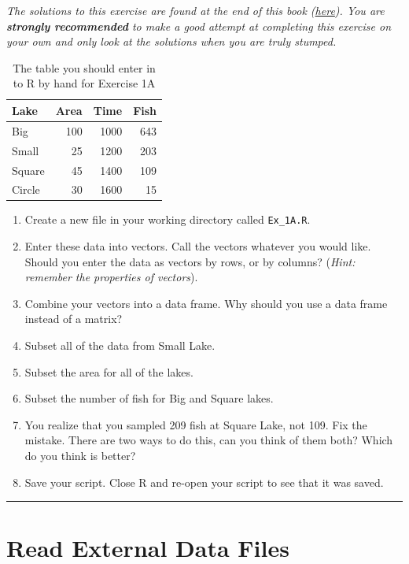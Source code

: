 \documentclass[]{book}
\providecommand{\tightlist}{%
  \setlength{\itemsep}{0pt}\setlength{\parskip}{0pt}}
\begin{document}
\emph{The solutions to this exercise are found at the end of this book (\protect\hyperlink{ex1a-answers}{here}). You are \textbf{strongly recommended} to make a good attempt at completing this exercise on your own and only look at the solutions when you are truly stumped.}

\begin{table}[t]

\caption{\label{tab:ex-1-table-pdf}The table you should enter in to R by hand for Exercise 1A}
\centering
\begin{tabular}{l|r|r|r}
\hline
Lake & Area & Time & Fish\\
\hline
Big & 100 & 1000 & 643\\
\hline
Small & 25 & 1200 & 203\\
\hline
Square & 45 & 1400 & 109\\
\hline
Circle & 30 & 1600 & 15\\
\hline
\end{tabular}
\end{table}

\begin{enumerate}
\def\labelenumi{\arabic{enumi}.}
\tightlist
\item
  Create a new file in your working directory called \texttt{Ex\_1A.R}.
\item
  Enter these data into vectors. Call the vectors whatever you would like. Should you enter the data as vectors by rows, or by columns? (\emph{Hint: remember the properties of vectors}).
\item
  Combine your vectors into a data frame. Why should you use a data frame instead of a matrix?
\item
  Subset all of the data from Small Lake.
\item
  Subset the area for all of the lakes.
\item
  Subset the number of fish for Big and Square lakes.
\item
  You realize that you sampled 209 fish at Square Lake, not 109. Fix the mistake. There are two ways to do this, can you think of them both? Which do you think is better?
\item
  Save your script. Close R and re-open your script to see that it was saved.
\end{enumerate}

\begin{center}\rule{0.5\linewidth}{\linethickness}\end{center}

\hypertarget{read}{%
\section{Read External Data Files}\label{read}}
\end{document}
